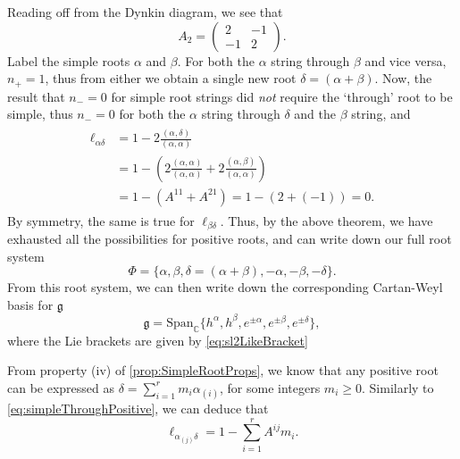 \documentclass[11pt,fleqn]{article}
\begin{document}
\begin{example}
	Reading off from the Dynkin diagram, we see that
		\begin{equation}
			A_2 = \begin{pmatrix}
				2 & -1 \\ -1 & 2
			\end{pmatrix}.
		\end{equation}
	Label the simple roots $\alpha$ and $\beta$. For both the $\alpha$ string through $\beta$ and vice versa, $n_+ = 1$, thus from either we obtain a single new root $\delta = (\alpha + \beta)$. Now, the result that $n_- = 0$ for simple root strings did \textit{not} require the `through' root to be simple, thus $n_- = 0$ for both the $\alpha$ string through $\delta$ and the $\beta$ string, and 
		\begin{align}\begin{split}\label{eq:simpleThroughPositive}
			\ell_{\alpha \delta} 
			&= 1 - 2\frac{(\alpha, \delta)}{(\alpha, \alpha)} \\
			&= 1 - \left( 2 \frac{(\alpha, \alpha)}{(\alpha, \alpha)} + 2 \frac{(\alpha, \beta)}{(\alpha, \alpha)}\right)\\
			&= 1 - \left( A^{11} + A^{21} \right) = 1 - (2 + (-1)) = 0.
		\end{split}\end{align}
	By symmetry, the same is true for $\ell_{\beta \delta}$. Thus, by the above theorem, we have exhausted all the possibilities for positive roots, and can write down our full root system
		\begin{equation}
			\Phi = \{ \alpha, \beta, \delta = (\alpha + \beta), -\alpha, -\beta, -\delta \}.
		\end{equation}
	From this root system, we can then write down the corresponding Cartan-Weyl basis for $\mathfrak{g}$
		\begin{equation}
			\mathfrak{g} = \text{Span}_\mathbb{C} \{ h^\alpha, h^\beta, e^{\pm \alpha}, e^{\pm \beta}, e^{\pm \delta} \},
		\end{equation}
	where the Lie brackets are given by \eqref{eq:sl2LikeBracket}
\end{example}

\begin{remark}
	From property (iv) of \autoref{prop:SimpleRootProps}, we know that any positive root can be expressed as $\delta = \sum_{i=1}^r m_i \alpha_{(i)}$, for some integers $m_i \geq 0$. Similarly to \eqref{eq:simpleThroughPositive}, we can deduce that
		\begin{equation}
			\ell_{\alpha_{(j)} \delta} = 1 - \sum_{i=1}^r A^{ij}m_i.
		\end{equation}
\end{remark}
\end{document}

